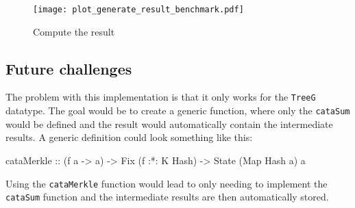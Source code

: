 \begin{figure}[H]
  \centering
  
  \texttt{[image: plot\_generate\_result\_benchmark.pdf]}
  \caption{Compute the result}
  \label{fig-compute-result}
\end{figure}

\subsection{Future challenges}

The problem with this implementation is that it only works for the \texttt{TreeG} datatype. The goal would be to create a generic function, where only the \texttt{cataSum} would be defined and the result would automatically contain the intermediate results. A generic definition could look something like this:

\begin{haskell}
cataMerkle :: (f a -> a) -> Fix (f :*: K Hash) -> State (Map Hash a) a
\end{haskell}

Using the \texttt{cataMerkle} function would lead to only needing to implement the \texttt{cataSum} function and the intermediate results are then automatically stored.